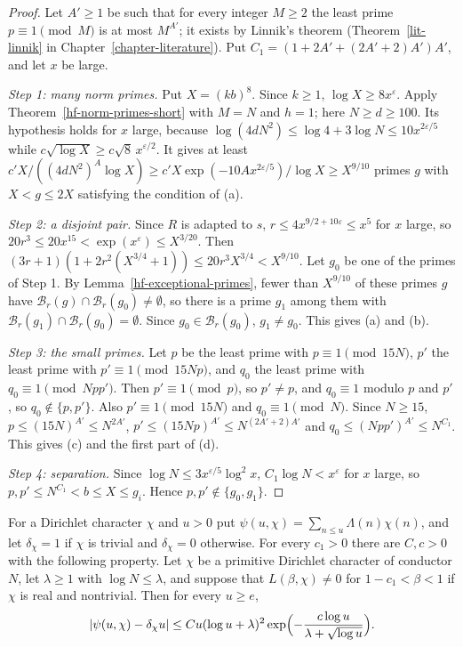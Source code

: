 \begin{proof}
Let $A'\geq1$ be such that for every integer $M\geq2$ the least prime $p\equiv1\pmod M$ is at most
$M^{A'}$; it exists by Linnik's theorem (Theorem~\ref{lit-linnik} in
Chapter~\ref{chapter-literature}). Put $C_1=(1+2A'+(2A'+2)A')A'$, and let $x$ be large.

\emph{Step 1: many norm primes.} Put $X=(kb)^8$. Since $k\geq1$, $\log X\geq8x^\varepsilon$. Apply
Theorem~\ref{hf-norm-primes-short} with $M=N$ and $h=1$; here $N\geq d\geq100$. Its hypothesis holds
for $x$ large, because $\log(4dN^2)\leq\log4+3\log N\leq10x^{2\varepsilon/5}$ while
$c\sqrt{\log X}\geq c\sqrt8\,x^{\varepsilon/2}$. It gives at least
$c'X/((4dN^2)^A\log X)\geq c'X\exp(-10Ax^{2\varepsilon/5})/\log X\geq X^{9/10}$ primes $g$ with
$X<g\leq2X$ satisfying the condition of (a).

\emph{Step 2: a disjoint pair.} Since $R$ is adapted to $s$, $r\leq4x^{9/2+10\varepsilon}\leq x^5$
for $x$ large, so $20r^3\leq20x^{15}<\exp(x^\varepsilon)\leq X^{3/20}$. Then
$(3r+1)(1+2r^2(X^{3/4}+1))\leq20r^3X^{3/4}<X^{9/10}$. Let $g_0$ be one of the primes of Step 1. By
Lemma~\ref{hf-exceptional-primes}, fewer than $X^{9/10}$ of these primes $g$ have
$\mathcal B_r(g)\cap\mathcal B_r(g_0)\neq\emptyset$, so there is a prime $g_1$ among them with
$\mathcal B_r(g_1)\cap\mathcal B_r(g_0)=\emptyset$. Since $g_0\in\mathcal B_r(g_0)$, $g_1\neq g_0$.
This gives (a) and (b).

\emph{Step 3: the small primes.} Let $p$ be the least prime with $p\equiv1\pmod{15N}$, $p'$ the least
prime with $p'\equiv1\pmod{15Np}$, and $q_0$ the least prime with $q_0\equiv1\pmod{Npp'}$. Then
$p'\equiv1\pmod p$, so $p'\neq p$, and $q_0\equiv1$ modulo $p$ and $p'$, so $q_0\notin\{p,p'\}$.
Also $p'\equiv1\pmod{15N}$ and $q_0\equiv1\pmod N$. Since $N\geq15$, $p\leq(15N)^{A'}\leq N^{2A'}$,
$p'\leq(15Np)^{A'}\leq N^{(2A'+2)A'}$ and $q_0\leq(Npp')^{A'}\leq N^{C_1}$. This gives (c) and the
first part of (d).

\emph{Step 4: separation.} Since $\log N\leq3x^{\varepsilon/5}\log^2x$,
$C_1\log N<x^\varepsilon$ for $x$ large, so $p,p'\leq N^{C_1}<b\leq X\leq g_i$. Hence
$p,p'\notin\{g_0,g_1\}$.
\end{proof}

\begin{theorem}\label{hf-pnt-character}
For a Dirichlet character $\chi$ and $u>0$ put $\psi(u,\chi)=\sum_{n\leq u}\Lambda(n)\chi(n)$, and
let $\delta_\chi=1$ if $\chi$ is trivial and $\delta_\chi=0$ otherwise. For every $c_1>0$ there are
$C,c>0$ with the following property. Let $\chi$ be a primitive Dirichlet character of conductor $N$,
let $\lambda\geq1$ with $\log N\leq\lambda$, and suppose that $L(\beta,\chi)\neq0$ for
$1-c_1<\beta<1$ if $\chi$ is real and nontrivial. Then for every $u\geq e$,
\[
 |\psi(u,\chi)-\delta_\chi u|\leq Cu(\log u+\lambda)^2\exp\Bigl(-\frac{c\log u}{\lambda+\sqrt{\log u}}\Bigr).
\]
\end{theorem}

